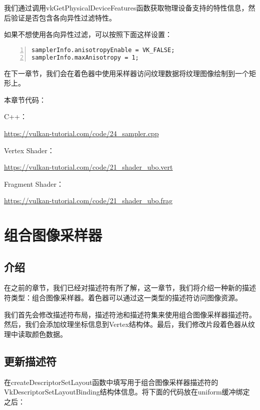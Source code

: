 \documentclass{ctexart}
\begin{document}
我们通过调用vkGetPhysicalDeviceFeatures函数获取物理设备支持的特性信息，然后验证是否包含各向异性过滤特性。

如果不想使用各向异性过滤，可以按照下面这样设置：

\begin{lstlisting}[language={[ANSI]C},keywordstyle=\color{blue!70},commentstyle=\color{red!50!green!50!blue!50},frame=shadowbox, rulesepcolor=\color{red!20!green!20!blue!20},basicstyle=\small,numbers=left, numberstyle=\tiny,breaklines=true]
samplerInfo.anisotropyEnable = VK_FALSE;
samplerInfo.maxAnisotropy = 1;
\end{lstlisting}

在下一章节，我们会在着色器中使用采样器访问纹理数据将纹理图像绘制到一个矩形上。

本章节代码：

C++：

\url{https://vulkan-tutorial.com/code/24_sampler.cpp}

Vertex Shader：

\url{https://vulkan-tutorial.com/code/21_shader_ubo.vert}

Fragment Shader：

\url{https://vulkan-tutorial.com/code/21_shader_ubo.frag}

\newpage
\section{组合图像采样器}

\subsection{介绍}

在之前的章节，我们已经对描述符有所了解，这一章节，我们将介绍一种新的描述符类型：组合图像采样器。着色器可以通过这一类型的描述符访问图像资源。

我们首先会修改描述符布局，描述符池和描述符集来使用组合图像采样器描述符。然后，我们会添加纹理坐标信息到Vertex结构体。最后，我们修改片段着色器从纹理中读取颜色数据。

\subsection{更新描述符}

在createDescriptorSetLayout函数中填写用于组合图像采样器描述符的VkDescriptorSetLayoutBinding结构体信息。将下面的代码放在uniform缓冲绑定之后：
\end{document}
